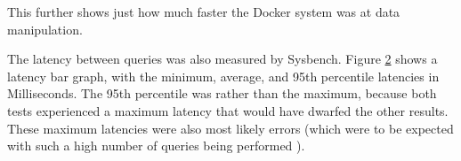 This further shows just how much faster the Docker system was at data manipulation.

\begin{figure}[H]
\caption{}
\label{fig:test2onesecgraph}
\centering
\end{figure}

The latency between queries was also measured by Sysbench. Figure \ref{test2latencygraph} shows a latency bar graph, with the minimum, average, and 95th percentile latencies in Milliseconds. The 95th percentile was rather than the maximum, because both tests experienced a maximum latency that would have dwarfed the other results. These maximum latencies were also most likely errors (which were to be expected with such a high number of queries being performed \citep{oltp}).

\begin{figure}[H]
\caption{}
\label{test2latencygraph}
\centering
\end{figure}

